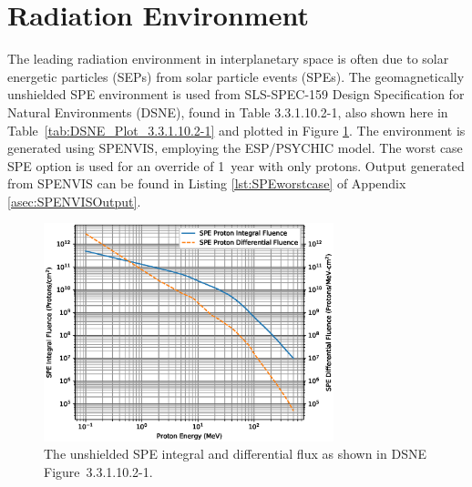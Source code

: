 \documentclass{hitec}
\begin{document}
\section{Radiation Environment}\label{sec:RadiationEnvironment}

The leading radiation environment in interplanetary space is often due to solar energetic particles (SEPs) from solar particle events (SPEs). The geomagnetically unshielded SPE environment is used from SLS-SPEC-159 Design Specification for Natural Environments (DSNE), found in Table 3.3.1.10.2-1, also shown here in Table~\ref{tab:DSNE_Plot_3.3.1.10.2-1} and plotted in Figure \ref{fig:DSNE_Plot_3.3.1.10.2-1}. The environment is generated using SPENVIS, employing the ESP/PSYCHIC model. The worst case SPE option is used for an override of 1~year with only protons. Output generated from SPENVIS can be found in Listing \ref{lst:SPEworstcase} of Appendix \ref{asec:SPENVISOutput}.

\begin{figure}[h!]
	\centering
	\includegraphics[width=0.75\textwidth]{DSNE_Plot_3.3.1.10.2-1.eps}
	\caption{The unshielded SPE integral and differential flux as shown in DSNE Figure~3.3.1.10.2-1.}\label{fig:DSNE_Plot_3.3.1.10.2-1}
\end{figure}

\end{document}
